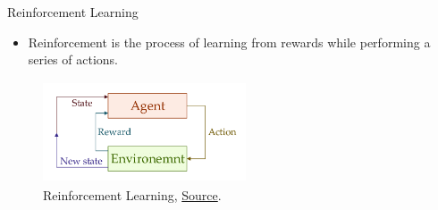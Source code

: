 \documentclass[compress,oilve]{beamer}
\begin{document}
\begin{frame}{Reinforcement Learning}
\begin{itemize}
	\item Reinforcement is the process of learning from rewards while performing a series of actions.
\end{itemize}

	\begin{figure}
		 \centering
		 \includegraphics[width=6cm, height=3cm]{Figs/31.png}  
		 \caption{Reinforcement Learning, \href{https://tinyurl.com/2f6plway}{Source}.}
	\end{figure}

\end{frame}
\end{document}

